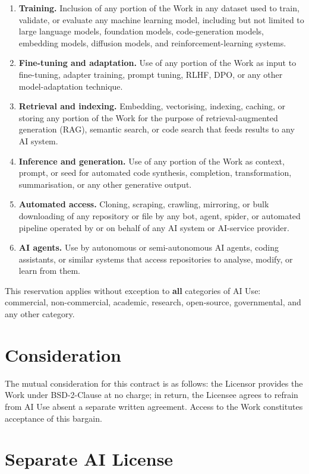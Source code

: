 \documentclass[11pt]{article}
\begin{document}
\begin{enumerate}[leftmargin=2em]
\item \textbf{Training.}  Inclusion of any portion of the Work in
  any dataset used to train, validate, or evaluate any machine
  learning model, including but not limited to large language
  models, foundation models, code-generation models, embedding
  models, diffusion models, and reinforcement-learning systems.
\item \textbf{Fine-tuning and adaptation.}  Use of any portion of
  the Work as input to fine-tuning, adapter training, prompt
  tuning, RLHF, DPO, or any other model-adaptation technique.
\item \textbf{Retrieval and indexing.}  Embedding, vectorising,
  indexing, caching, or storing any portion of the Work for the
  purpose of retrieval-augmented generation (RAG), semantic
  search, or code search that feeds results to any AI system.
\item \textbf{Inference and generation.}  Use of any portion of
  the Work as context, prompt, or seed for automated code
  synthesis, completion, transformation, summarisation, or any
  other generative output.
\item \textbf{Automated access.}  Cloning, scraping, crawling,
  mirroring, or bulk downloading of any repository or file by any
  bot, agent, spider, or automated pipeline operated by or on
  behalf of any AI system or AI-service provider.
\item \textbf{AI agents.}  Use by autonomous or semi-autonomous
  AI agents, coding assistants, or similar systems that access
  repositories to analyse, modify, or learn from them.
\end{enumerate}

This reservation applies without exception to \textbf{all}
categories of AI Use: commercial, non-commercial, academic,
research, open-source, governmental, and any other category.

\section{Consideration}

The mutual consideration for this contract is as follows: the
Licensor provides the Work under BSD-2-Clause at no charge; in
return, the Licensee agrees to refrain from AI Use absent a
separate written agreement.  Access to the Work constitutes
acceptance of this bargain.

\section{Separate AI License}
\end{document}
